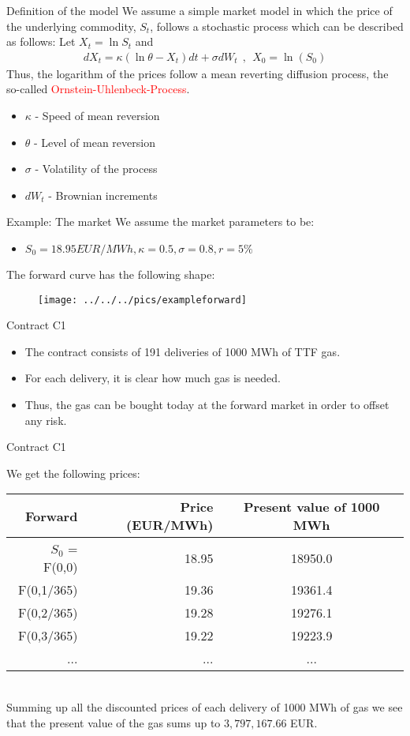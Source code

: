 {Definition of the model}
We assume a simple market model in which the price of the underlying commodity, $S_t$, follows a stochastic process which can be described as follows:
Let $X_t = \ln S_t$ and
\begin{align*}
	dX_t = \kappa (\ln \theta - X_t)dt + \sigma dW_t~~,~~X_0 = \ln(S_0)
\end{align*}
Thus, the logarithm of the prices follow a mean reverting diffusion process, the so-called \textcolor{red}{Ornstein-Uhlenbeck-Process}.\\
\begin{itemize}
\item $\kappa$ - Speed of mean reversion
\item $\theta$ - Level of mean reversion
\item $\sigma$ - Volatility of the process
\item $dW_t$ - Brownian increments
\end{itemize}



{Example: The market}
We assume the market parameters to be:
\begin{itemize}
\item $S_0 = 18.95 EUR/MWh, \kappa = 0.5, \sigma = 0.8, r= 5\%$
\end{itemize}
The forward curve has the following shape:
\begin{figure}
	\centering
		\texttt{[image: ../../../pics/exampleforward]}
	\label{fig:exampleforward}
\end{figure}





{Contract C1}
\begin{itemize}
\item<1-> The contract consists of 191 deliveries of 1000 MWh of TTF gas.
\item<2-> For each delivery, it is clear how much gas is needed.
\item<3-> Thus, the gas can be bought today at the forward market in order to offset any risk.
\end{itemize}


{Contract C1}

We get the following prices:
\begin{tabular}{rrc}
   Forward &      Price (EUR/MWh)& Present value of 1000 MWh \\
\hline
$S_0$ = F(0,0) &         18.95 &      18950.0 \\

 F(0,1/365) &    19.36 &    19361.4 \\

 F(0,2/365) &    19.28 &    19276.1 \\

 F(0,3/365) &    19.22 &    19223.9 \\
...&...&...\\
\end{tabular}  \\
Summing up all the discounted prices of each delivery of 1000 MWh of gas we see that the present value of the gas sums up to $3,797,167.66$ EUR.



